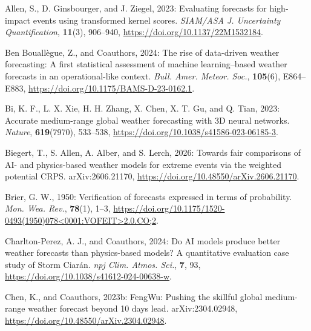 \documentclass[12pt]{article}
\begin{document}
\begin{Exercises}
\item\hspace*{-6mm}
Allen, S., D. Ginsbourger, and J. Ziegel, 2023: Evaluating forecasts for high-impact events using transformed kernel scores. \textit{SIAM/ASA J. Uncertainty Quantification}, \textbf{11}(3), 906--940, \url{https://doi.org/10.1137/22M1532184}.

\item\hspace*{-6mm}
Ben Bouall\`egue, Z., and Coauthors, 2024: The rise of data-driven weather forecasting: A first statistical assessment of machine learning--based weather forecasts in an operational-like context. \textit{Bull. Amer. Meteor. Soc.}, \textbf{105}(6), E864--E883, \url{https://doi.org/10.1175/BAMS-D-23-0162.1}.

\item\hspace*{-6mm}
Bi, K. F., L. X. Xie, H. H. Zhang, X. Chen, X. T. Gu, and Q. Tian, 2023: Accurate medium-range global weather forecasting with 3D neural networks. \textit{Nature}, \textbf{619}(7970), 533--538, \url{https://doi.org/10.1038/s41586-023-06185-3}.

\item\hspace*{-6mm}
Biegert, T., S. Allen, A. Alber, and S. Lerch, 2026: Towards fair comparisons of AI- and physics-based weather models for extreme events via the weighted potential CRPS. arXiv:2606.21170, \url{https://doi.org/10.48550/arXiv.2606.21170}.

\item\hspace*{-6mm}
Brier, G. W., 1950: Verification of forecasts expressed in terms of probability. \textit{Mon. Wea. Rev.}, \textbf{78}(1), 1--3, \url{https://doi.org/10.1175/1520-0493(1950)078<0001:VOFEIT>2.0.CO;2}.

\item\hspace*{-6mm}
Charlton-Perez, A. J., and Coauthors, 2024: Do AI models produce better weather forecasts than physics-based models? A quantitative evaluation case study of Storm Ciar\'an. \textit{npj Clim. Atmos. Sci.}, \textbf{7}, 93, \url{https://doi.org/10.1038/s41612-024-00638-w}.

\item\hspace*{-6mm}
Chen, K., and Coauthors, 2023b: FengWu: Pushing the skillful global medium-range weather forecast beyond 10 days lead. arXiv:2304.02948, \url{https://doi.org/10.48550/arXiv.2304.02948}.


\end{Exercises}
\end{document}

